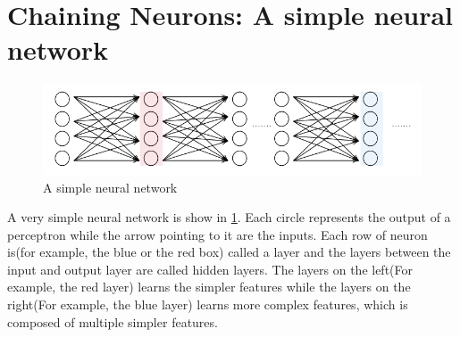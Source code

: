 \section{Chaining Neurons: A simple neural network}
\begin{figure}
    \begin{center}
        \includegraphics[width=\textwidth]{graphics/nn}
    \end{center}
    \caption{A simple neural network}\label{nn}
\end{figure}
\noindent A very simple neural network is show in \ref{nn}. Each circle represents the output of a perceptron while the arrow pointing to it are the inputs. Each row of neuron is(for example, the blue or the red
box) called a layer and the layers between the input and output layer are called hidden layers.
The layers on the left(For example, the red layer) learns the simpler features while the layers on the
right(For example, the blue layer) learns more complex features, which is composed of multiple
simpler features.
